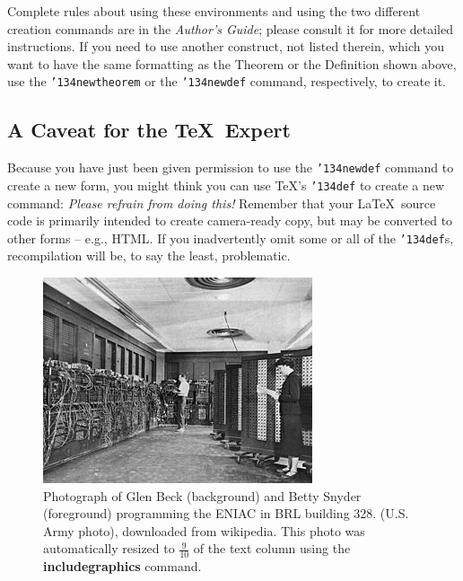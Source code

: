 \documentclass[twoside,letterpaper]{soups}
\begin{document}
Complete rules about using these environments and using the
two different creation commands are in the
\textit{Author's Guide}; please consult it for more
detailed instructions.  If you need to use another construct,
not listed therein, which you want to have the same
formatting as the Theorem
or the Definition \cite{salas:calculus} shown above,
use the \texttt{{\char'134}newtheorem} or the
\texttt{{\char'134}newdef} command,
respectively, to create it.

\subsection*{A {\secit Caveat} for the \TeX\ Expert}
Because you have just been given permission to
use the \texttt{{\char'134}newdef} command to create a
new form, you might think you can
use \TeX's \texttt{{\char'134}def} to create a
new command: \textit{Please refrain from doing this!}
Remember that your \LaTeX\ source code is primarily intended
to create camera-ready copy, but may be converted
to other forms -- e.g., HTML. If you inadvertently omit
some or all of the \texttt{{\char'134}def}s, recompilation will
be, to say the least, problematic.

\begin{figure}
\begin{center}
\includegraphics[width=.9\columnwidth]{300px-Eniac.jpg}
\end{center}
\caption{Photograph of Glen Beck (background) and Betty Snyder
  (foreground) programming the ENIAC in BRL building 328. (U.S. Army
  photo), downloaded from wikipedia. This photo was automatically
  resized to ${\frac{9}{10}}$ of the text column using
  the \textbf{includegraphics} command.}
\end{figure}
\end{document}
